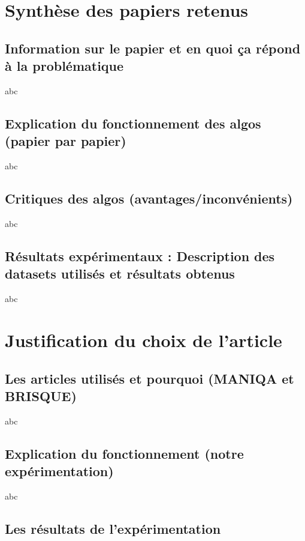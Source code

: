 \documentclass{ieeeaccess}
\begin{document}
\section{Synthèse des papiers retenus}

\subsection{Information sur le papier et en quoi ça répond à la problématique}

abc

\subsection{Explication du fonctionnement des algos (papier par papier)}

abc

\subsection{Critiques des algos (avantages/inconvénients)}

abc

\subsection{Résultats expérimentaux : Description des datasets utilisés et résultats obtenus}

abc

\section{Justification du choix de l'article}

\subsection{Les articles utilisés et pourquoi (MANIQA et BRISQUE)}

abc

\subsection{Explication du fonctionnement (notre expérimentation)}

abc

\subsection{Les résultats de l'expérimentation}
\end{document}
